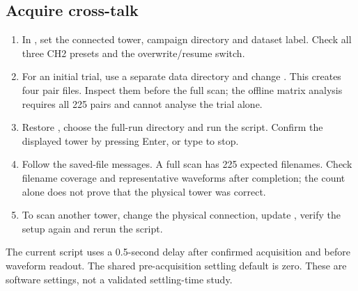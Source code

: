 \subsection{Acquire cross-talk}
\begin{enumerate}
\item In , set the connected tower, campaign directory and dataset label. Check all three CH2 presets and the overwrite/resume switch.
\item For an initial trial, use a separate data directory and change . This creates four pair files. Inspect them before the full scan; the offline matrix analysis requires all 225 pairs and cannot analyse the trial alone.
\item Restore , choose the full-run directory and run the script. Confirm the displayed tower by pressing Enter, or type  to stop.
\item Follow the saved-file messages. A full scan has 225 expected filenames. Check filename coverage and representative waveforms after completion; the count alone does not prove that the physical tower was correct.
\item To scan another tower, change the physical connection, update , verify the setup again and rerun the script.
\end{enumerate}
The current script uses a 0.5-second delay after confirmed acquisition and before waveform readout. The shared pre-acquisition settling default is zero. These are software settings, not a validated settling-time study.

